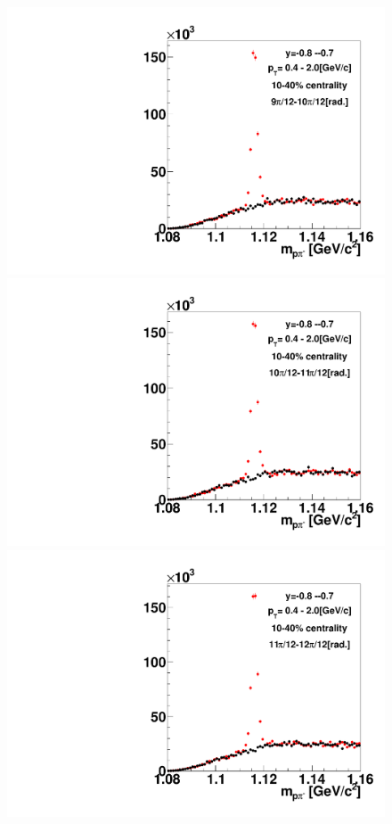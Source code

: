 \begin{figure}[h]
\includegraphics[width=0.14\linewidth]{chapterX/fig/ld_v1_sig/kf_ptslice0_cent1_ld_flow_phi10_rap12_check.pdf}
\includegraphics[width=0.14\linewidth]{chapterX/fig/ld_v1_sig/kf_ptslice0_cent1_ld_flow_phi11_rap12_check.pdf}
\includegraphics[width=0.14\linewidth]{chapterX/fig/ld_v1_sig/kf_ptslice0_cent1_ld_flow_phi12_rap12_check.pdf}


\end{figure}
